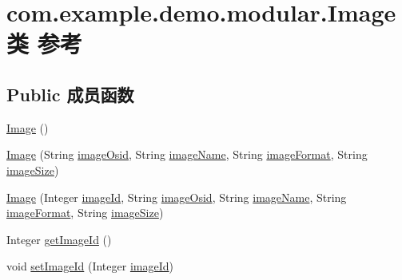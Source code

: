 \hypertarget{classcom_1_1example_1_1demo_1_1modular_1_1_image}{}\section{com.\+example.\+demo.\+modular.\+Image类 参考}
\label{classcom_1_1example_1_1demo_1_1modular_1_1_image}
\subsection*{Public 成员函数}
\begin{DoxyCompactItemize}
\item 
\mbox{\hyperlink{classcom_1_1example_1_1demo_1_1modular_1_1_image_a23ae4b9eff6751920cfc04728a9de5b2}{Image}} ()
\item 
\mbox{\hyperlink{classcom_1_1example_1_1demo_1_1modular_1_1_image_ae0f0a54c68ab05a26bebf8c6e0332296}{Image}} (String \mbox{\hyperlink{classcom_1_1example_1_1demo_1_1modular_1_1_image_af741ae48c80ac4463a6ec745f8031281}{image\+Osid}}, String \mbox{\hyperlink{classcom_1_1example_1_1demo_1_1modular_1_1_image_a60502bbc6bab0885108008533d27f2ef}{image\+Name}}, String \mbox{\hyperlink{classcom_1_1example_1_1demo_1_1modular_1_1_image_a4ffd48e614a03eea6d25032154fc0e68}{image\+Format}}, String \mbox{\hyperlink{classcom_1_1example_1_1demo_1_1modular_1_1_image_a5e71bd39f3465c6ec72f03ae6eed54a1}{image\+Size}})
\item 
\mbox{\hyperlink{classcom_1_1example_1_1demo_1_1modular_1_1_image_a79ea36352ce96a5b55e13b652f69bdd2}{Image}} (Integer \mbox{\hyperlink{classcom_1_1example_1_1demo_1_1modular_1_1_image_a9019827cd65b58f00146b6b1dc31e92e}{image\+Id}}, String \mbox{\hyperlink{classcom_1_1example_1_1demo_1_1modular_1_1_image_af741ae48c80ac4463a6ec745f8031281}{image\+Osid}}, String \mbox{\hyperlink{classcom_1_1example_1_1demo_1_1modular_1_1_image_a60502bbc6bab0885108008533d27f2ef}{image\+Name}}, String \mbox{\hyperlink{classcom_1_1example_1_1demo_1_1modular_1_1_image_a4ffd48e614a03eea6d25032154fc0e68}{image\+Format}}, String \mbox{\hyperlink{classcom_1_1example_1_1demo_1_1modular_1_1_image_a5e71bd39f3465c6ec72f03ae6eed54a1}{image\+Size}})
\item 
Integer \mbox{\hyperlink{classcom_1_1example_1_1demo_1_1modular_1_1_image_aa8c71d593ba08a5ac9079bae0e8b5de9}{get\+Image\+Id}} ()
\item 
void \mbox{\hyperlink{classcom_1_1example_1_1demo_1_1modular_1_1_image_aca2b6a1fcb1eb0591e396d7916475021}{set\+Image\+Id}} (Integer \mbox{\hyperlink{classcom_1_1example_1_1demo_1_1modular_1_1_image_a9019827cd65b58f00146b6b1dc31e92e}{image\+Id}})

\end{DoxyCompactItemize}
